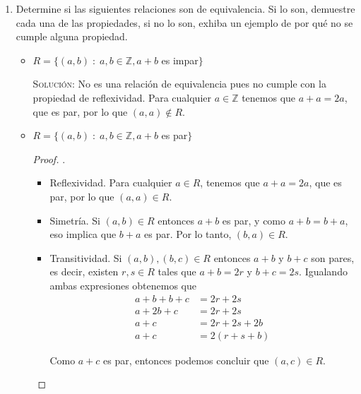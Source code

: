 \documentclass[letterpaper,11pt]{article}
\begin{document}
\begin{enumerate}
    \item Determine si las siguientes relaciones son de equivalencia. Si lo son,
    demuestre cada una de las propiedades, si no lo son, exhiba un ejemplo de  
    por qué no se cumple alguna propiedad.
    \begin{itemize}
        \item $R = \{(a,b) \; : \; a,b \in ℤ, a+b$ es impar$\}$

        \textsc{Solución:} No es una relación de equivalencia pues no cumple 
        con la propiedad de reflexividad. Para cualquier $a \in ℤ$ tenemos que 
        $a + a = 2a$, que es par, por lo que $(a, a) ∉ R$.
        
        \item $R = \{(a,b) \; : \; a,b \in ℤ, a+b$ es par$\}$

        \begin{proof} . 
            \begin{itemize}
                \item Reflexividad. Para cualquier $a ∈ R$, tenemos que 
                $a + a = 2a$, que es par, por lo que $(a, a) ∈ R$. 

                \item Simetría. Si $(a, b) ∈ R$ entonces $a + b$ es par, y 
                como $a + b = b + a$, eso implica que $b + a$ es par. Por lo 
                tanto, $(b, a) ∈ R$. 

                \item Transitividad. Si $(a, b), (b, c) ∈ R$ entonces $a + b$ y 
                $b + c$ son pares, es decir, existen $r, s ∈ R$ tales que 
                $a + b = 2r$ y $b + c = 2s$. Igualando ambas expresiones 
                obtenemos que 
                \begin{align*}
                    a + b + b + c &= 2r + 2s \\ 
                    a + 2b +c &= 2r + 2s \\ 
                    a + c &= 2r + 2s + 2b \\ 
                    a + c &= 2(r + s +b)
                \end{align*} 
                
                Como $a + c$ es par, entonces podemos concluir que $(a, c) ∈ R$. 
            \end{itemize}
        \end{proof}


\end{itemize}
\end{enumerate}
\end{document}
